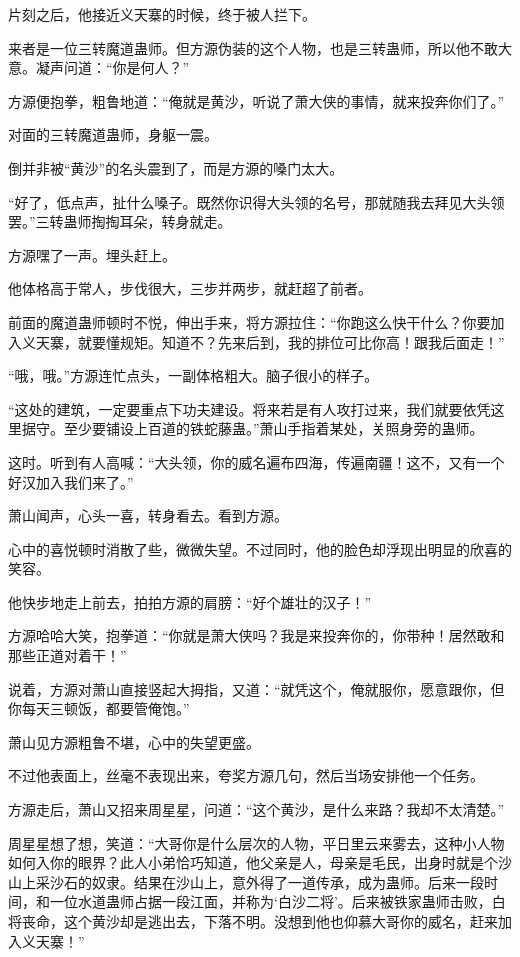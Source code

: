 \begin{this_body}
片刻之后，他接近义天寨的时候，终于被人拦下。

来者是一位三转魔道蛊师。但方源伪装的这个人物，也是三转蛊师，所以他不敢大意。凝声问道：“你是何人？”

方源便抱拳，粗鲁地道：“俺就是黄沙，听说了萧大侠的事情，就来投奔你们了。”

对面的三转魔道蛊师，身躯一震。

倒并非被“黄沙”的名头震到了，而是方源的嗓门太大。

“好了，低点声，扯什么嗓子。既然你识得大头领的名号，那就随我去拜见大头领罢。”三转蛊师掏掏耳朵，转身就走。

方源嘿了一声。埋头赶上。

他体格高于常人，步伐很大，三步并两步，就赶超了前者。

前面的魔道蛊师顿时不悦，伸出手来，将方源拉住：“你跑这么快干什么？你要加入义天寨，就要懂规矩。知道不？先来后到，我的排位可比你高！跟我后面走！”

“哦，哦。”方源连忙点头，一副体格粗大。脑子很小的样子。

“这处的建筑，一定要重点下功夫建设。将来若是有人攻打过来，我们就要依凭这里据守。至少要铺设上百道的铁蛇藤蛊。”萧山手指着某处，关照身旁的蛊师。

这时。听到有人高喊：“大头领，你的威名遍布四海，传遍南疆！这不，又有一个好汉加入我们来了。”

萧山闻声，心头一喜，转身看去。看到方源。

心中的喜悦顿时消散了些，微微失望。不过同时，他的脸色却浮现出明显的欣喜的笑容。

他快步地走上前去，拍拍方源的肩膀：“好个雄壮的汉子！”

方源哈哈大笑，抱拳道：“你就是萧大侠吗？我是来投奔你的，你带种！居然敢和那些正道对着干！”

说着，方源对萧山直接竖起大拇指，又道：“就凭这个，俺就服你，愿意跟你，但你每天三顿饭，都要管俺饱。”

萧山见方源粗鲁不堪，心中的失望更盛。

不过他表面上，丝毫不表现出来，夸奖方源几句，然后当场安排他一个任务。

方源走后，萧山又招来周星星，问道：“这个黄沙，是什么来路？我却不太清楚。”

周星星想了想，笑道：“大哥你是什么层次的人物，平日里云来雾去，这种小人物如何入你的眼界？此人小弟恰巧知道，他父亲是人，母亲是毛民，出身时就是个沙山上采沙石的奴隶。结果在沙山上，意外得了一道传承，成为蛊师。后来一段时间，和一位水道蛊师占据一段江面，并称为‘白沙二将’。后来被铁家蛊师击败，白将丧命，这个黄沙却是逃出去，下落不明。没想到他也仰慕大哥你的威名，赶来加入义天寨！”


\end{this_body}
